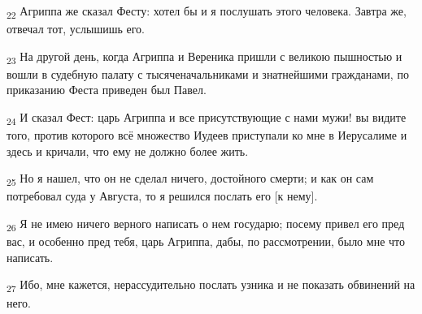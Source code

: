 \begin{tcolorbox}
\textsubscript{22} Агриппа же сказал Фесту: хотел бы и я послушать этого человека. Завтра же, отвечал тот, услышишь его.
\end{tcolorbox}
\begin{tcolorbox}
\textsubscript{23} На другой день, когда Агриппа и Вереника пришли с великою пышностью и вошли в судебную палату с тысяченачальниками и знатнейшими гражданами, по приказанию Феста приведен был Павел.
\end{tcolorbox}
\begin{tcolorbox}
\textsubscript{24} И сказал Фест: царь Агриппа и все присутствующие с нами мужи! вы видите того, против которого всё множество Иудеев приступали ко мне в Иерусалиме и здесь и кричали, что ему не должно более жить.
\end{tcolorbox}
\begin{tcolorbox}
\textsubscript{25} Но я нашел, что он не сделал ничего, достойного смерти; и как он сам потребовал суда у Августа, то я решился послать его [к нему].
\end{tcolorbox}
\begin{tcolorbox}
\textsubscript{26} Я не имею ничего верного написать о нем государю; посему привел его пред вас, и особенно пред тебя, царь Агриппа, дабы, по рассмотрении, было мне что написать.
\end{tcolorbox}
\begin{tcolorbox}
\textsubscript{27} Ибо, мне кажется, нерассудительно послать узника и не показать обвинений на него.
\end{tcolorbox}
